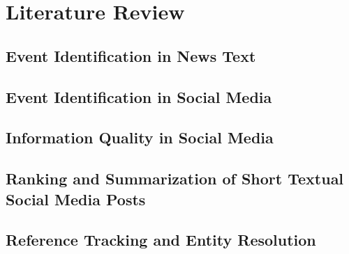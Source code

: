 
\chapter{Literature Review} %

\label{review} %


\section{Event Identification in News Text}

\section{Event Identification in Social Media}

\section{Information Quality in Social Media}

\section{Ranking and Summarization of Short Textual Social Media Posts}

\section{Reference Tracking and Entity Resolution}
